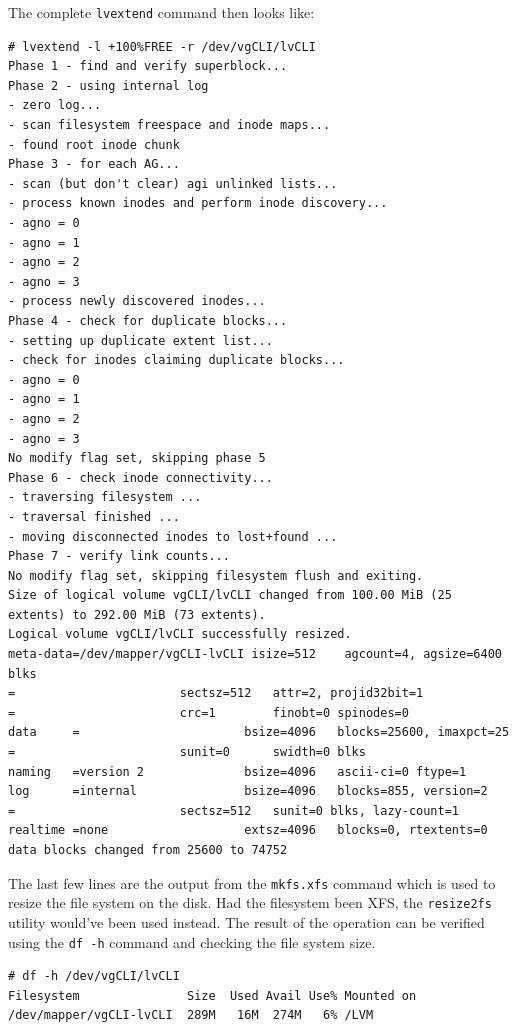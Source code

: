 \noindent
The complete \verb|lvextend| command then looks like:

\vspace{-15pt}
\begin{verbatim}
# lvextend -l +100%FREE -r /dev/vgCLI/lvCLI
Phase 1 - find and verify superblock...
Phase 2 - using internal log
- zero log...
- scan filesystem freespace and inode maps...
- found root inode chunk
Phase 3 - for each AG...
- scan (but don't clear) agi unlinked lists...
- process known inodes and perform inode discovery...
- agno = 0
- agno = 1
- agno = 2
- agno = 3
- process newly discovered inodes...
Phase 4 - check for duplicate blocks...
- setting up duplicate extent list...
- check for inodes claiming duplicate blocks...
- agno = 0
- agno = 1
- agno = 2
- agno = 3
No modify flag set, skipping phase 5
Phase 6 - check inode connectivity...
- traversing filesystem ...
- traversal finished ...
- moving disconnected inodes to lost+found ...
Phase 7 - verify link counts...
No modify flag set, skipping filesystem flush and exiting.
Size of logical volume vgCLI/lvCLI changed from 100.00 MiB (25 extents) to 292.00 MiB (73 extents).
Logical volume vgCLI/lvCLI successfully resized.
meta-data=/dev/mapper/vgCLI-lvCLI isize=512    agcount=4, agsize=6400 blks
=                       sectsz=512   attr=2, projid32bit=1
=                       crc=1        finobt=0 spinodes=0
data     =                       bsize=4096   blocks=25600, imaxpct=25
=                       sunit=0      swidth=0 blks
naming   =version 2              bsize=4096   ascii-ci=0 ftype=1
log      =internal               bsize=4096   blocks=855, version=2
=                       sectsz=512   sunit=0 blks, lazy-count=1
realtime =none                   extsz=4096   blocks=0, rtextents=0
data blocks changed from 25600 to 74752
\end{verbatim}
\vspace{-10pt}

\noindent
The last few lines are the output from the \verb|mkfs.xfs| command which is used to resize the file system on the disk. Had the filesystem been XFS, the \verb|resize2fs| utility would've been used instead. The result of the operation can be verified using the \verb|df -h| command and checking the file system size.

\vspace{-15pt}
\begin{verbatim}
# df -h /dev/vgCLI/lvCLI
Filesystem               Size  Used Avail Use% Mounted on
/dev/mapper/vgCLI-lvCLI  289M   16M  274M   6% /LVM
\end{verbatim}
\vspace{-10pt}

